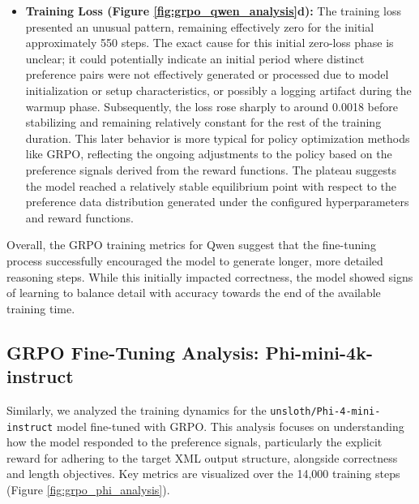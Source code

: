 \documentclass[11pt]{article}
\begin{document}
\begin{itemize}
\begin{itemize}
    \item \textbf{Training Loss (Figure \ref{fig:grpo_qwen_analysis}d):} The training loss presented an unusual pattern, remaining effectively zero for the initial approximately 550 steps. The exact cause for this initial zero-loss phase is unclear; it could potentially indicate an initial period where distinct preference pairs were not effectively generated or processed due to model initialization or setup characteristics, or possibly a logging artifact during the warmup phase. Subsequently, the loss rose sharply to around 0.0018 before stabilizing and remaining relatively constant for the rest of the training duration. This later behavior is more typical for policy optimization methods like GRPO, reflecting the ongoing adjustments to the policy based on the preference signals derived from the reward functions. The plateau suggests the model reached a relatively stable equilibrium point with respect to the preference data distribution generated under the configured hyperparameters and reward functions.
\end{itemize}

Overall, the GRPO training metrics for Qwen suggest that the fine-tuning process successfully encouraged the model to generate longer, more detailed reasoning steps. While this initially impacted correctness, the model showed signs of learning to balance detail with accuracy towards the end of the available training time.


\subsection{GRPO Fine-Tuning Analysis: Phi-mini-4k-instruct}

Similarly, we analyzed the training dynamics for the \texttt{unsloth/Phi-4-mini-instruct} model fine-tuned with GRPO. This analysis focuses on understanding how the model responded to the preference signals, particularly the explicit reward for adhering to the target XML output structure, alongside correctness and length objectives. Key metrics are visualized over the 14,000 training steps (Figure \ref{fig:grpo_phi_analysis}).

\begin{figure}[htbp]
    \centering
    \newcommand{\graphwidthtwo}{0.48\textwidth}


\end{figure}
\end{itemize}
\end{document}
